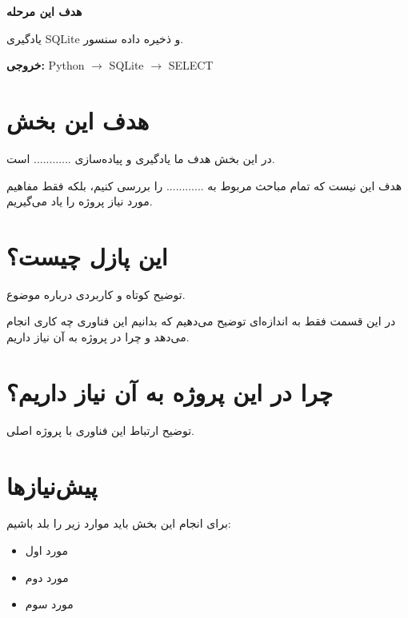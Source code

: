 \begin{tcolorbox}
\textbf{هدف این مرحله}

یادگیری SQLite و ذخیره داده سنسور.

\textbf{خروجی:}
Python $\rightarrow$ SQLite $\rightarrow$ SELECT
\end{tcolorbox}


\section{هدف این بخش}

در این بخش هدف ما یادگیری و پیاده‌سازی ............ است.

هدف این نیست که تمام مباحث مربوط به ............ را بررسی کنیم،
بلکه فقط مفاهیم مورد نیاز پروژه را یاد می‌گیریم.



\section{این پازل چیست؟}

توضیح کوتاه و کاربردی درباره موضوع.

در این قسمت فقط به اندازه‌ای توضیح می‌دهیم که بدانیم
این فناوری چه کاری انجام می‌دهد و چرا در پروژه به آن نیاز داریم.



\section{چرا در این پروژه به آن نیاز داریم؟}

توضیح ارتباط این فناوری با پروژه اصلی.



\section{پیش‌نیازها}

برای انجام این بخش باید موارد زیر را بلد باشیم:

\begin{itemize}

    \item مورد اول
    \item مورد دوم
    \item مورد سوم

\end{itemize}


